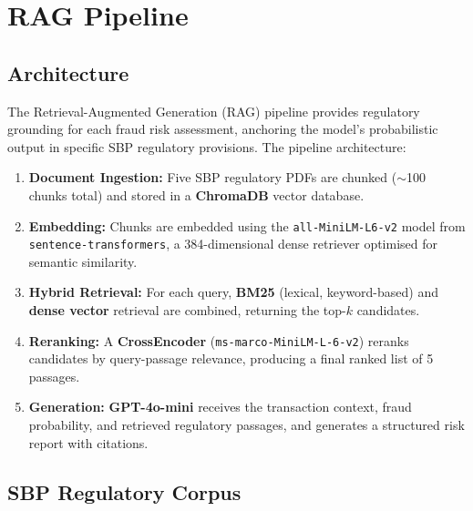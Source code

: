 \documentclass[12pt,a4paper]{article}
\begin{document}
\section{RAG Pipeline}

\label{sec:rag}

\subsection{Architecture}

The Retrieval-Augmented Generation (RAG) pipeline provides regulatory grounding for each fraud risk assessment, anchoring the model's probabilistic output in specific SBP regulatory provisions. The pipeline architecture:

\begin{enumerate}[noitemsep]
  \item \textbf{Document Ingestion:} Five SBP regulatory PDFs are chunked ($\sim$100 chunks total) and stored in a \textbf{ChromaDB} vector database.
  \item \textbf{Embedding:} Chunks are embedded using the \texttt{all-MiniLM-L6-v2} model from \texttt{sentence-transformers}, a 384-dimensional dense retriever optimised for semantic similarity.
  \item \textbf{Hybrid Retrieval:} For each query, \textbf{BM25} (lexical, keyword-based) and \textbf{dense vector} retrieval are combined, returning the top-$k$ candidates.
  \item \textbf{Reranking:} A \textbf{CrossEncoder} (\texttt{ms-marco-MiniLM-L-6-v2}) reranks candidates by query-passage relevance, producing a final ranked list of 5 passages.
  \item \textbf{Generation:} \textbf{GPT-4o-mini} receives the transaction context, fraud probability, and retrieved regulatory passages, and generates a structured risk report with citations.
\end{enumerate}

\subsection{SBP Regulatory Corpus}
\end{document}
